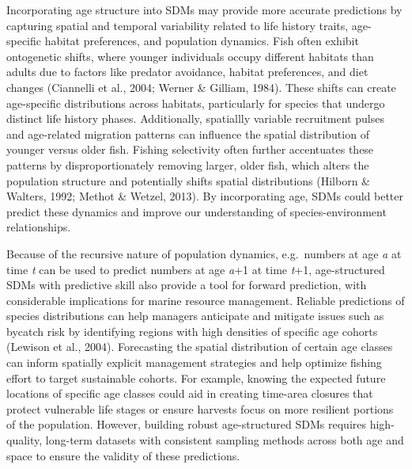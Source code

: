 \documentclass[
]{article}
\begin{document}
Incorporating age structure into SDMs may provide more accurate
predictions by capturing spatial and temporal variability related to
life history traits, age-specific habitat preferences, and population
dynamics. Fish often exhibit ontogenetic shifts, where younger
individuals occupy different habitats than adults due to factors like
predator avoidance, habitat preferences, and diet changes (Ciannelli et
al., 2004; Werner \& Gilliam, 1984). These shifts can create
age-specific distributions across habitats, particularly for species
that undergo distinct life history phases. Additionally, spatiallly
variable recruitment pulses and age-related migration patterns can
influence the spatial distribution of younger versus older fish. Fishing
selectivity often further accentuates these patterns by
disproportionately removing larger, older fish, which alters the
population structure and potentially shifts spatial distributions
(Hilborn \& Walters, 1992; Methot \& Wetzel, 2013). By incorporating
age, SDMs could better predict these dynamics and improve our
understanding of species-environment relationships.

Because of the recursive nature of population dynamics, e.g.~numbers at
age \emph{a} at time \emph{t} can be used to predict numbers at age
\emph{a}+1 at time \emph{t}+1, age-structured SDMs with predictive skill
also provide a tool for forward prediction, with considerable
implications for marine resource management. Reliable predictions of
species distributions can help managers anticipate and mitigate issues
such as bycatch risk by identifying regions with high densities of
specific age cohorts (Lewison et al., 2004). Forecasting the spatial
distribution of certain age classes can inform spatially explicit
management strategies and help optimize fishing effort to target
sustainable cohorts. For example, knowing the expected future locations
of specific age classes could aid in creating time-area closures that
protect vulnerable life stages or ensure harvests focus on more
resilient portions of the population. However, building robust
age-structured SDMs requires high-quality, long-term datasets with
consistent sampling methods across both age and space to ensure the
validity of these predictions.
\end{document}
